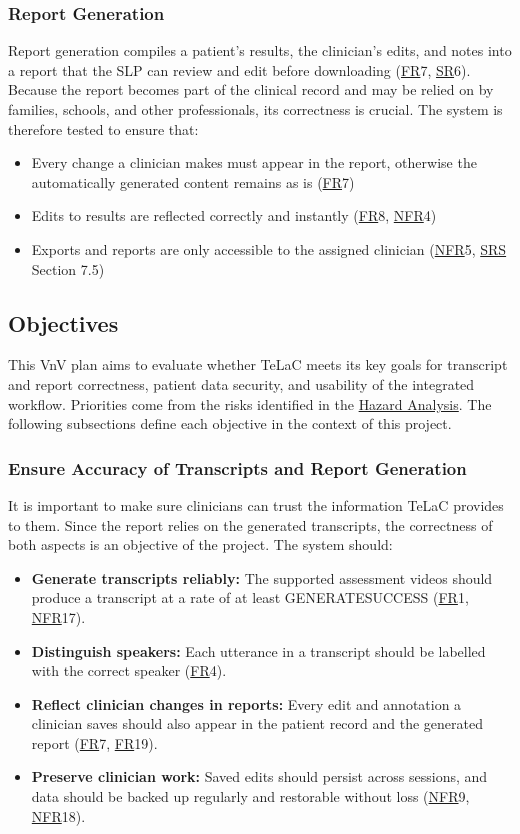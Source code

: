 \documentclass[12pt, titlepage]{article}
\newcommand{\SRSLink}{\href{https://github.com/Nour-Fawaz/MacaBoca/blob/main/pdfs/SRS/SRS.pdf}{SRS}}
\newcommand{\HALink}{\href{https://github.com/Nour-Fawaz/MacaBoca/blob/main/pdfs/HazardAnalysis/HazardAnalysis.pdf}{Hazard Analysis}}
\newcommand{\srsfr}[1]{\href{https://github.com/Nour-Fawaz/MacaBoca/blob/main/pdfs/SRS/SRS.pdf}{FR}}
\newcommand{\srsnfr}[1]{\href{https://github.com/Nour-Fawaz/MacaBoca/blob/main/pdfs/SRS/SRS.pdf}{NFR}}
\newcommand{\srssr}[1]{\href{https://github.com/Nour-Fawaz/MacaBoca/blob/main/pdfs/SRS/SRS.pdf}{SR}}
\renewcommand{\_}{\oldunderscore\allowbreak}
\begin{document}
\subsubsection{Report Generation}
Report generation compiles a patient’s results, the clinician’s edits, and notes into a report that the SLP can review and edit before downloading (\srsfr*{7}, \srssr*{6}). 
Because the report becomes part of the clinical record and may be relied on by families, schools, and other professionals, its correctness is crucial. 
The system is therefore tested to ensure that:
\begin{itemize}
  \item Every change a clinician makes must appear in the report, otherwise the automatically generated content remains as is (\srsfr*{7})
  \item Edits to results are reflected correctly and instantly (\srsfr*{8}, \srsnfr*{4})
  \item Exports and reports are only accessible to the assigned clinician (\srsnfr*{5}, \SRSLink{} Section 7.5)
\end{itemize}


\subsection{Objectives}

This VnV plan aims to evaluate whether TeLaC meets its key goals for transcript and report correctness, patient data security, and usability of the integrated workflow. Priorities come from the risks identified in the \HALink{}. The following subsections define each objective in the context of this project.

\subsubsection{Ensure Accuracy of Transcripts and Report Generation}
It is important to make sure clinicians can trust the information TeLaC provides to them. Since the report relies on the generated transcripts, the correctness of both aspects is an objective of the project. The system should:
\begin{itemize}
  \item \textbf{Generate transcripts reliably:} The supported assessment videos should produce a transcript at a rate of at least GENERATE\_SUCCESS (\srsfr*{1}, \srsnfr*{17}).
  \item \textbf{Distinguish speakers:} Each utterance in a transcript should be labelled with the correct speaker (\srsfr*{4}).
  \item \textbf{Reflect clinician changes in reports:} Every edit and annotation a clinician saves should also appear in the patient record and the generated report (\srsfr*{7}, \srsfr*{19}).
  \item \textbf{Preserve clinician work:} Saved edits should persist across sessions, and data should be backed up regularly and restorable without loss (\srsnfr*{9}, \srsnfr*{18}).
\end{itemize}
\end{document}
